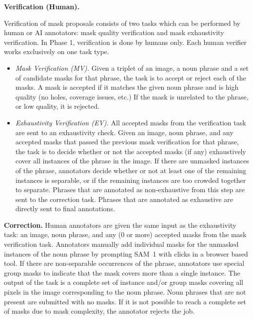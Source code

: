 \documentclass[]{fairmeta}
\newcommand{\samone}{SAM~1\xspace}
\renewcommand{\paragraph}[1]{%
	\noindent\textbf{#1.}\noindent\xspace%
}
\begin{document}
\paragraph{Verification (Human)}
Verification of mask proposals consists of two tasks which can be performed by human or AI annotators: mask quality verification and mask exhaustivity verification. In Phase 1, verification is done by humans only. Each human verifier works exclusively on one task type.
\begin{itemize}
	\item \textit{Mask Verification (MV).} Given a triplet of an image, a noun phrase and a set of candidate masks for that phrase, the task is to accept or reject each of the masks. A mask is accepted if it matches the given noun phrase and is high quality (no holes, coverage issues, etc.) If the mask is unrelated to the phrase, or low quality, it is rejected. 
	
	\item \textit{Exhaustivity Verification (EV).} All accepted masks from the verification task are sent to an exhaustivity check. Given an image, noun phrase, and any accepted masks that passed the previous mask verification for that phrase, the task is to decide whether or not the accepted masks (if any) exhaustively cover all instances of the phrase in the image. If there are unmasked instances of the phrase, annotators decide whether or not at least one of the remaining instances is separable, or if the remaining instances are too crowded together to separate. Phrases that are annotated as non-exhaustive from this step are sent to the correction task. Phrases that are annotated as exhaustive are directly sent to final annotations.
\end{itemize}

\paragraph{Correction} Human annotators are given the same input as the exhaustivity task: an image, noun phrase, and any (0 or more) accepted masks from the mask verification task. Annotators manually add individual masks for the unmasked instances of the noun phrase by prompting \samone with clicks in a browser based tool. If there are non-separable occurrences of the phrase, annotators use special group masks to indicate that the mask covers more than a single instance. The output of the task is a complete set of instance and/or group masks covering all pixels in the image corresponding to the noun phrase. Noun phrases that are not present are submitted with no masks. If it is not possible to reach a complete set of masks due to mask complexity, the annotator rejects the job. 
\end{document}

